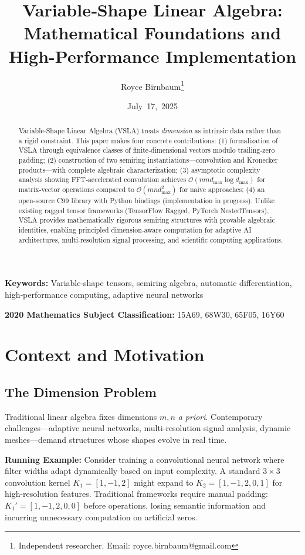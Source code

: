 \documentclass[11pt]{article}
\title{Variable‑Shape Linear Algebra: Mathematical Foundations and High-Performance Implementation}
\author{Royce Birnbaum\thanks{Independent researcher. Email: royce.birnbaum@gmail.com}}
\date{July 17, 2025}
\newcommand{\keywords}[1]{\textbf{Keywords:} #1}
\newcommand{\msc}[1]{\textbf{2020 Mathematics Subject Classification:} #1}
\begin{document}
\maketitle

\begin{abstract}
Variable‑Shape Linear Algebra (VSLA) treats \emph{dimension} as intrinsic data rather than a rigid constraint. This paper makes four concrete contributions: (1) formalization of VSLA through equivalence classes of finite‑dimensional vectors modulo trailing‑zero padding; (2) construction of two semiring instantiations—convolution and Kronecker products—with complete algebraic characterization; (3) asymptotic complexity analysis showing FFT‑accelerated convolution achieves $\mathcal{O}(mn d_{\max} \log d_{\max})$ for matrix‑vector operations compared to $\mathcal{O}(mn d_{\max}^2)$ for naive approaches; (4) an open‑source C99 library with Python bindings (implementation in progress). Unlike existing ragged tensor frameworks (TensorFlow Ragged, PyTorch NestedTensors), VSLA provides mathematically rigorous semiring structures with provable algebraic identities, enabling principled dimension‑aware computation for adaptive AI architectures, multi‑resolution signal processing, and scientific computing applications.
\end{abstract}

\vspace{0.5em}
\noindent\keywords{Variable‑shape tensors, semiring algebra, automatic differentiation, high‑performance computing, adaptive neural networks}

\noindent\msc{15A69, 68W30, 65F05, 16Y60}

\section{Context and Motivation}
\subsection{The Dimension Problem}
Traditional linear algebra fixes dimensions \(m,n\) \emph{a priori}.  Contemporary challenges—adaptive neural networks, multi‑resolution signal analysis, dynamic meshes—demand structures whose shapes evolve in real time.  

\textbf{Running Example:} Consider training a convolutional neural network where filter widths adapt dynamically based on input complexity. A standard $3 \times 3$ convolution kernel $K_1 = [1, -1, 2]$ might expand to $K_2 = [1, -1, 2, 0, 1]$ for high-resolution features. Traditional frameworks require manual padding: $K_1' = [1, -1, 2, 0, 0]$ before operations, losing semantic information and incurring unnecessary computation on artificial zeros.
\end{document}
